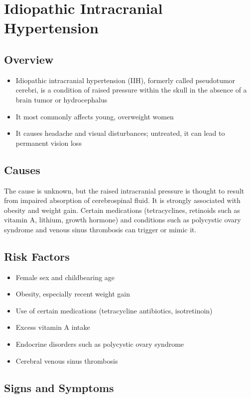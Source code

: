 \chapter{Idiopathic Intracranial Hypertension}
\label{sec:Idiopathic Intracranial Hypertension}

\section{Overview}
\begin{itemize}[noitemsep]
  \item Idiopathic intracranial hypertension (IIH), formerly called pseudotumor cerebri, is a condition of raised pressure within the skull in the absence of a brain tumor or hydrocephalus
  \item It most commonly affects young, overweight women
  \item It causes headache and visual disturbances; untreated, it can lead to permanent vision loss
\end{itemize}
\section{Causes}
The cause is unknown, but the raised intracranial pressure is thought to result from impaired absorption of cerebrospinal fluid. It is strongly associated with obesity and weight gain. Certain medications (tetracyclines, retinoids such as vitamin A, lithium, growth hormone) and conditions such as polycystic ovary syndrome and venous sinus thrombosis can trigger or mimic it.
\section{Risk Factors}
\begin{itemize}[noitemsep]
  \item Female sex and childbearing age
  \item Obesity, especially recent weight gain
  \item Use of certain medications (tetracycline antibiotics, isotretinoin)
  \item Excess vitamin A intake
  \item Endocrine disorders such as polycystic ovary syndrome
  \item Cerebral venous sinus thrombosis
\end{itemize}
\section{Signs and Symptoms}

